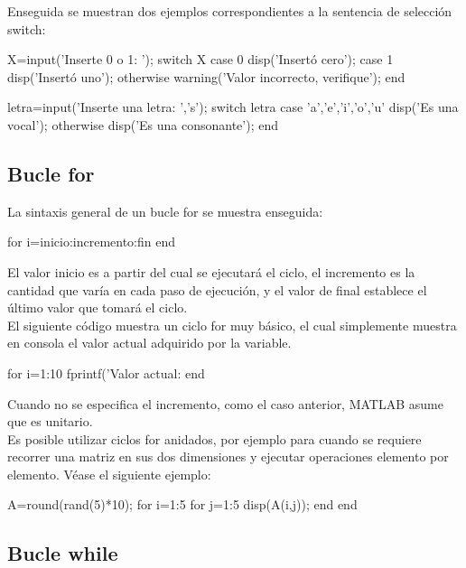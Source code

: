 Enseguida se muestran dos ejemplos correspondientes a la sentencia de
selección switch:

\begin{matlab}
X=input('Inserte 0 o 1: ');
switch X
    case 0
        disp('Insertó cero');
    case 1
        disp('Insertó uno');
    otherwise
        warning('Valor incorrecto, verifique');     
end


letra=input('Inserte una letra: ','s');
switch letra
    case {'a','e','i','o','u'}
        disp('Es una vocal');
    otherwise
        disp('Es una consonante');
end
\end{matlab}

\subsection{Bucle for}\label{bucle-for}

La sintaxis general de un bucle for se muestra enseguida:

\begin{matlab}
for i=inicio:incremento:fin
end
\end{matlab}

El valor inicio es a partir del cual se ejecutará el ciclo, el
incremento es la cantidad que varía en cada paso de ejecución, y el
valor de final establece el último valor que tomará el ciclo.\\

El siguiente código muestra un ciclo for muy básico, el cual simplemente
muestra en consola el valor actual adquirido por la variable.

\begin{matlab}
for i=1:10
    fprintf('Valor actual: %
end
\end{matlab}

Cuando no se especifica el incremento, como el caso anterior, MATLAB
asume que es unitario.\\

Es posible utilizar ciclos for anidados, por ejemplo para cuando se
requiere recorrer una matriz en sus dos dimensiones y ejecutar
operaciones elemento por elemento. Véase el siguiente ejemplo:

\begin{matlab}
A=round(rand(5)*10);
for i=1:5
    for j=1:5
        disp(A(i,j));
    end
end
\end{matlab}

\subsection{Bucle while}\label{bucle-while}

